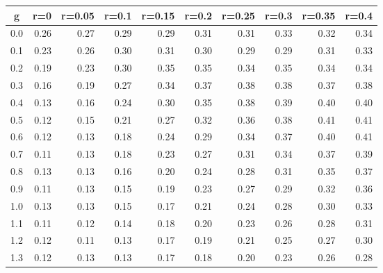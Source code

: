 %
\begin{table}[!tbp]
 \begin{center}
 \begin{tabular}{rrrrrrrrrr}\hline\hline
\multicolumn{1}{c}{g}&\multicolumn{1}{c}{r=0}&\multicolumn{1}{c}{r=0.05}&\multicolumn{1}{c}{r=0.1}&\multicolumn{1}{c}{r=0.15}&\multicolumn{1}{c}{r=0.2}&\multicolumn{1}{c}{r=0.25}&\multicolumn{1}{c}{r=0.3}&\multicolumn{1}{c}{r=0.35}&\multicolumn{1}{c}{r=0.4}\tabularnewline
\hline
0.0&0.26&0.27&0.29&0.29&0.31&0.31&0.33&0.32&0.34\tabularnewline
0.1&0.23&0.26&0.30&0.31&0.30&0.29&0.29&0.31&0.33\tabularnewline
0.2&0.19&0.23&0.30&0.35&0.35&0.34&0.35&0.34&0.34\tabularnewline
0.3&0.16&0.19&0.27&0.34&0.37&0.38&0.38&0.37&0.38\tabularnewline
0.4&0.13&0.16&0.24&0.30&0.35&0.38&0.39&0.40&0.40\tabularnewline
0.5&0.12&0.15&0.21&0.27&0.32&0.36&0.38&0.41&0.41\tabularnewline
0.6&0.12&0.13&0.18&0.24&0.29&0.34&0.37&0.40&0.41\tabularnewline
0.7&0.11&0.13&0.18&0.23&0.27&0.31&0.34&0.37&0.39\tabularnewline
0.8&0.13&0.13&0.16&0.20&0.24&0.28&0.31&0.35&0.37\tabularnewline
0.9&0.11&0.13&0.15&0.19&0.23&0.27&0.29&0.32&0.36\tabularnewline
1.0&0.13&0.13&0.15&0.17&0.21&0.24&0.28&0.30&0.33\tabularnewline
1.1&0.11&0.12&0.14&0.18&0.20&0.23&0.26&0.28&0.31\tabularnewline
1.2&0.12&0.11&0.13&0.17&0.19&0.21&0.25&0.27&0.30\tabularnewline
1.3&0.12&0.13&0.13&0.17&0.18&0.20&0.23&0.26&0.28\tabularnewline
\hline
\end{tabular}

\end{center}

\end{table}

